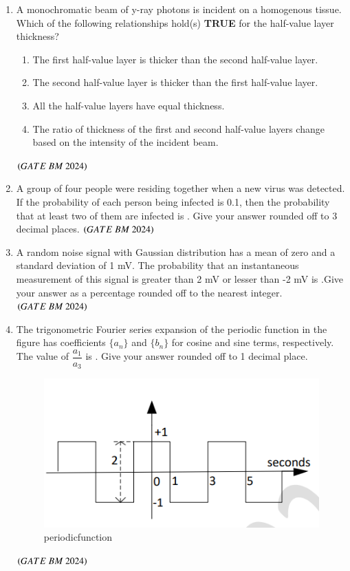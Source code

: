 \documentclass[journal,12pt,onecolumn]{IEEEtran}
\theoremstyle{remark}
\begin{document}
\begin{enumerate}
\item A monochromatic beam of y-ray photons is incident on a homogenous tissue. Which
of the following relationships hold(s) \textbf{TRUE} for the half-value layer thickness?
\begin{enumerate}[label=(\Alph*)]
\item The first half-value layer is thicker than the second half-value layer.
\item The second half-value layer is thicker than the first half-value layer.
\item All the half-value layers have equal thickness.
\item The ratio of thickness of the first and second half-value layers change based on the
intensity of the incident beam.
\end{enumerate}
\hfill $\brak{GATE\ BM\ 2024}$

\item A group of four people were residing together when a new virus was detected. If
the probability of each person being infected is 0.1, then the probability that at least
two of them are infected is \underline{\hspace{2cm}}. Give your answer rounded off to 3 decimal places. 
\hfill $\brak{GATE\ BM\ 2024}$

\item A random noise signal with Gaussian distribution has a mean of zero and a standard
deviation of 1 mV. The probability that an instantaneous measurement of this signal is greater than 2 mV or lesser than -2 mV is  \underline{\hspace{2cm}}.Give your answer as a percentage rounded off to the nearest  integer. \hfill $\brak{GATE\ BM\ 2024}$

\item The trigonometric Fourier series expansion of the periodic function in the figure has coefficients 
$\{a_n\}$ and $\{b_n\}$ for cosine and sine terms, respectively. 
The value of $\dfrac{a_1}{a_3}$ is \underline{\hspace{2cm}}. 
Give your answer rounded off to 1 decimal place.
\begin{figure}[H]
\centering
\includegraphics[width=0.4\columnwidth]{Figs/Fig 4.png}
\caption{periodicfunction}
\label{fig:placeholder}
\end{figure}
\hfill $\brak{GATE\ BM\ 2024}$


\end{enumerate}
\end{document}
